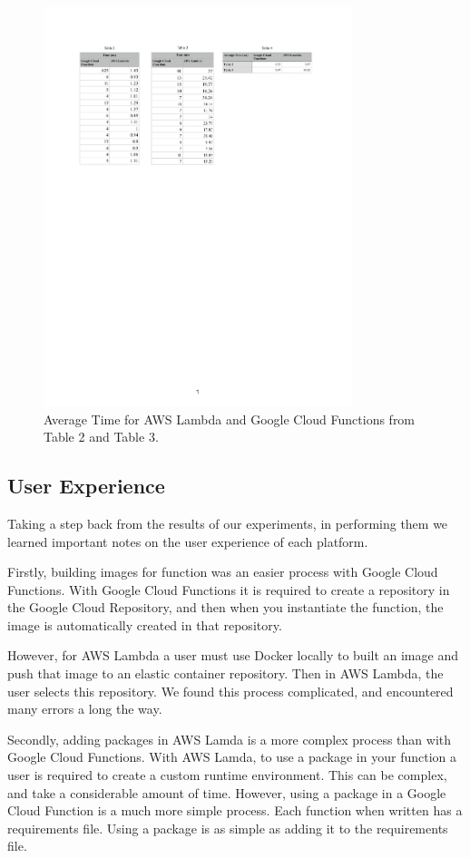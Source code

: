 \documentclass[10pt, conference]{IEEEtran}
\begin{document}
\begin{figure}[htbp]
\centerline{\includegraphics[width=9cm]{table4.PDF}}
\caption{Average Time for AWS Lambda and Google Cloud Functions from Table 2 and Table 3.}
\label{fig}
\end{figure}


\subsection{User Experience}

Taking a step back from the results of our experiments, in performing them we learned important notes on the user experience of each platform. 

Firstly, building images for function was an easier process with Google Cloud Functions. With Google Cloud Functions it is required to create a repository in the Google Cloud Repository, and then when you instantiate the function, the image is automatically created in that repository. 

However, for AWS Lambda a user must use Docker locally to built an image and push that image to an elastic container repository. Then in AWS Lambda, the user selects this repository. We found this process complicated, and encountered many errors a long the way. 

Secondly, adding packages in AWS Lamda is a more complex process than with Google Cloud Functions. With AWS Lamda, to use a package in your function a user is required to create a custom runtime environment. This can be complex, and take a considerable amount of time. However, using a package in a Google Cloud Function is a much more simple process. Each function when written has a requirements file. Using a package is as simple as adding it to the requirements file. 
\end{document}
